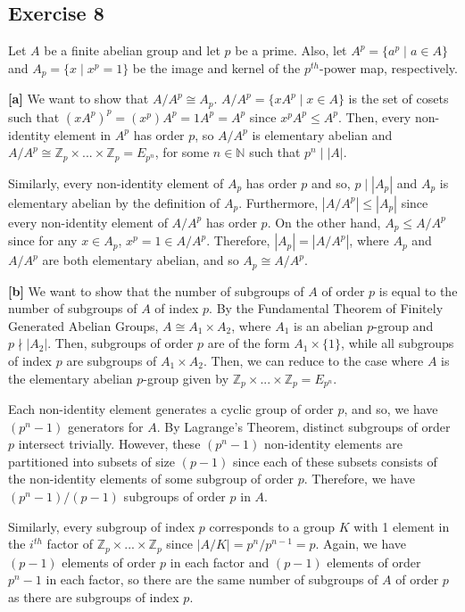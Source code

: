 \subsection*{Exercise 8}
Let $A$ be a finite abelian group and let $p$ be a prime. Also, let $A^p = \{a^p \mid a \in A\}$ and $A_p = \{x \mid x^p = 1\}$ be the image and kernel of the $p^{th}$-power map, respectively.

\textbf{[a]} We want to show that $A/A^p \cong A_p$. $A/A^p = \{xA^p \mid x \in A\}$ is the set of cosets such that $(xA^p)^p = (x^p)A^p = 1A^p = A^p$ since $x^pA^p \le A^p$. Then, every non-identity element in $A^p$ has order $p$, so $A/A^p$ is elementary abelian and $A/A^p \cong \mathbb{Z}_p \times ... \times \mathbb{Z}_p = E_{p^n}$, for some $n \in \mathbb{N}$ such that $p^n \mid |A|$.

Similarly, every non-identity element of $A_p$ has order $p$ and so, $p \mid |A_p|$ and $A_p$ is elementary abelian by the definition of $A_p$. Furthermore, $|A/A^p| \le |A_p|$ since every non-identity element of $A/A^p$ has order $p$. On the other hand, $A_p \le A/A^p$ since for any $x \in A_p$, $x^p = 1 \in A/A^p$. Therefore, $|A_p| = |A/A^p|$, where $A_p$ and $A/A^p$ are both elementary abelian, and so $A_p \cong A/A^p$.

\textbf{[b]} We want to show that the number of subgroups of $A$ of order $p$ is equal to the number of subgroups of $A$ of index $p$. By the Fundamental Theorem of Finitely Generated Abelian Groups, $A \cong A_1 \times A_2$, where $A_1$ is an abelian $p$-group and $p \nmid |A_2|$. Then, subgroups of order $p$ are of the form $A_1 \times \{1\}$, while all subgroups of index $p$ are subgroups of $A_1 \times A_2$. Then, we can reduce to the case where $A$ is the elementary abelian $p$-group given by $\mathbb{Z}_p \times ... \times \mathbb{Z}_p = E_{p^n}$. 

Each non-identity element generates a cyclic group of order $p$, and so, we have $(p^n-1)$ generators for $A$. By Lagrange's Theorem, distinct subgroups of order $p$ intersect trivially. However, these $(p^n-1)$ non-identity elements are partitioned into subsets of size $(p-1)$ since each of these subsets consists of the non-identity elements of some subgroup of order $p$. Therefore, we have $(p^n-1)/(p-1)$ subgroups of order $p$ in $A$.

Similarly, every subgroup of index $p$ corresponds to a group $K$ with 1 element in the $i^{th}$ factor of $\mathbb{Z}_p \times ... \times \mathbb{Z}_p$ since $|A/K| = p^n/p^{n-1} = p$. Again, we have $(p-1)$ elements of order $p$ in each factor and $(p-1)$ elements of order $p^n - 1$ in each factor, so there are the same number of subgroups of $A$ of order $p$ as there are subgroups of index $p$.
